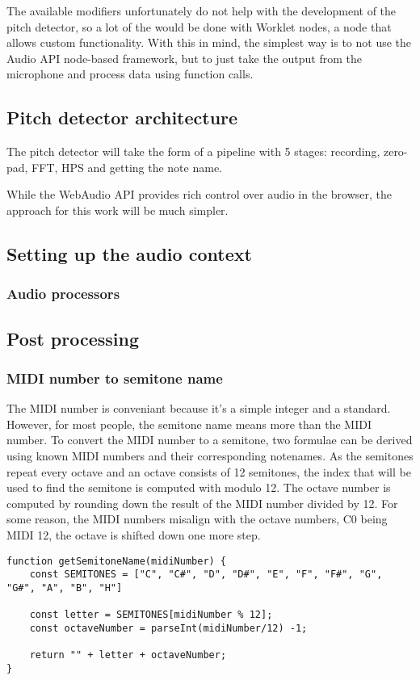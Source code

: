 The available modifiers unfortunately do not help with the development of the pitch detector, so a lot of the would be done with Worklet nodes, a node that allows custom functionality. With this in mind, the simplest way is to not use the Audio API node-based framework, but to just take the output from the microphone and process data using function calls.
\subsection{Pitch detector architecture}
The pitch detector will take the form of a pipeline with 5 stages: recording, zero-pad, FFT, HPS and getting the note name. 

While the WebAudio API provides rich control over audio in the browser, the approach for this work will be much simpler.  

\subsection{Setting up the audio context}
\subsubsection{Audio processors}

\subsection{Post processing}
\subsubsection{MIDI number to semitone name}
The MIDI number is conveniant because it's a simple integer and a standard. However, for most people, the semitone name means more than the MIDI number. To convert the MIDI number to a semitone, two formulae can be derived using known MIDI numbers and their corresponding notenames. As the semitones repeat every octave and an octave consists of 12 semitones, the index that will be used to find the semitone is computed with modulo 12. The octave number is computed by rounding down the result of the MIDI number divided by 12. For some reason, the MIDI numbers misalign with the octave numbers, C0 being MIDI 12, the octave is shifted down one more step. 
\begin{lstlisting}[style=javascript]
function getSemitoneName(midiNumber) {
    const SEMITONES = ["C", "C#", "D", "D#", "E", "F", "F#", "G", "G#", "A", "B", "H"]

    const letter = SEMITONES[midiNumber % 12];
    const octaveNumber = parseInt(midiNumber/12) -1;

    return "" + letter + octaveNumber; 
}
\end{lstlisting}


